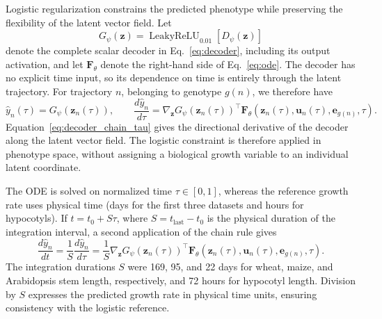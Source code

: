 \documentclass[preprint,12pt,authoryear]{elsarticle}
\begin{document}
Logistic regularization constrains the predicted phenotype while preserving the flexibility of the latent vector field. Let
\begin{equation}
 G_{\psi}(\mathbf z)
 =\operatorname{LeakyReLU}_{0.01}\!\left[D_{\psi}(\mathbf z)\right]
\end{equation}
denote the complete scalar decoder in Eq.~\eqref{eq:decoder}, including its output activation, and let $\mathbf F_{\theta}$ denote the right-hand side of Eq.~\eqref{eq:ode}. The decoder has no explicit time input, so its dependence on time is entirely through the latent trajectory. For trajectory $n$, belonging to genotype $g(n)$, we therefore have
\begin{equation}
 \hat y_n(\tau)=G_{\psi}\!\left(\mathbf z_n(\tau)\right),
 \qquad
 \frac{d\hat y_n}{d\tau}
 =\nabla_{\mathbf z}G_{\psi}\!\left(\mathbf z_n(\tau)\right)^{\!\top}
 \mathbf F_{\theta}\!\left(\mathbf z_n(\tau),\mathbf u_n(\tau),
 \mathbf e_{g(n)},\tau\right).
 \label{eq:decoder_chain_tau}
\end{equation}
Equation~\eqref{eq:decoder_chain_tau} gives the directional derivative of the decoder along the latent vector field. The logistic constraint is therefore applied in phenotype space, without assigning a biological growth variable to an individual latent coordinate.

The ODE is solved on normalized time $\tau\in[0,1]$, whereas the reference growth rate uses physical time (days for the first three datasets and hours for hypocotyls). If $t=t_0+S\tau$, where $S=t_{\mathrm{last}}-t_0$ is the physical duration of the integration interval, a second application of the chain rule gives
\begin{equation}
 \frac{d\hat y_n}{dt}
 =\frac{1}{S}\frac{d\hat y_n}{d\tau}
 =\frac{1}{S}
 \nabla_{\mathbf z}G_{\psi}\!\left(\mathbf z_n(\tau)\right)^{\!\top}
 \mathbf F_{\theta}\!\left(\mathbf z_n(\tau),\mathbf u_n(\tau),
 \mathbf e_{g(n)},\tau\right).
 \label{eq:decoder_chain_day}
\end{equation}
The integration durations $S$ were 169, 95, and 22 days for wheat, maize, and Arabidopsis stem length, respectively, and 72 hours for hypocotyl length. Division by $S$ expresses the predicted growth rate in physical time units, ensuring consistency with the logistic reference.
\end{document}
